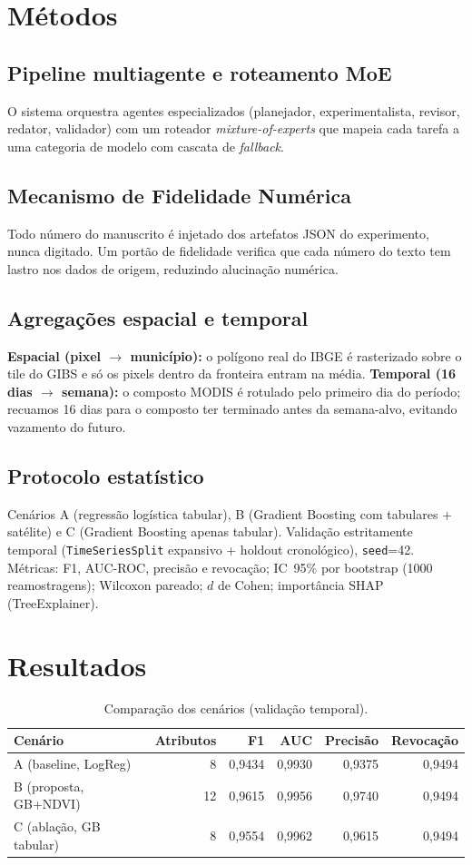 \documentclass[12pt,a4paper]{article}
\begin{document}
\section{Métodos}
\subsection{Pipeline multiagente e roteamento MoE}
O sistema orquestra agentes especializados (planejador, experimentalista,
revisor, redator, validador) com um roteador \emph{mixture-of-experts} que
mapeia cada tarefa a uma categoria de modelo com cascata de \emph{fallback}.

\subsection{Mecanismo de Fidelidade Numérica}
Todo número do manuscrito é injetado dos artefatos JSON do experimento, nunca
digitado. Um portão de fidelidade verifica que cada número do texto tem lastro
nos dados de origem, reduzindo alucinação numérica.

\subsection{Agregações espacial e temporal}
\textbf{Espacial (pixel $\to$ município):} o polígono real do IBGE é rasterizado
sobre o tile do GIBS e só os pixels dentro da fronteira entram na média.
\textbf{Temporal (16 dias $\to$ semana):} o composto MODIS é rotulado pelo
primeiro dia do período; recuamos 16 dias
para o composto ter terminado antes da semana-alvo, evitando vazamento do futuro.

\subsection{Protocolo estatístico}
Cenários A (regressão logística tabular), B (Gradient Boosting com tabulares +
satélite) e C (Gradient Boosting apenas tabular). Validação estritamente
temporal (\texttt{TimeSeriesSplit} expansivo + holdout cronológico),
\texttt{seed}=42. Métricas: F1, AUC-ROC, precisão e revocação; IC~95\% por
bootstrap (1000 reamostragens); Wilcoxon pareado; $d$ de Cohen;
importância SHAP (TreeExplainer).

\section{Resultados}
\begin{table}[h]
\centering
\caption{Comparação dos cenários (validação temporal).}
\begin{tabular}{lrrrrr}
\toprule
Cenário & Atributos & F1 & AUC & Precisão & Revocação \\
\midrule
A (baseline, LogReg) & 8 & 0,9434 & 0,9930 & 0,9375 & 0,9494 \\
B (proposta, GB+NDVI) & 12 & 0,9615 & 0,9956 & 0,9740 & 0,9494 \\
C (ablação, GB tabular) & 8 & 0,9554 & 0,9962 & 0,9615 & 0,9494 \\
\bottomrule
\end{tabular}
\end{table}
\end{document}
